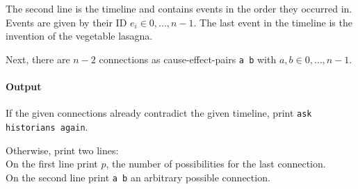 The second line is the timeline and contains events in the order they occurred in.
Events are given by their ID $e_i \in {0,...,n-1}$.
The last event in the timeline is the invention of the vegetable lasagna.

Next, there are $n-2$ connections as cause-effect-pairs \texttt{a b} with $a,b \in {0, \ldots ,n-1}$.

\paragraph*{Output}

If the given connections already contradict the given timeline, print \texttt{ask historians again}.

Otherwise, print two lines: \\
On the first line print $p$, the number of possibilities for the last connection. \\
On the second line print \texttt{a b} an arbitrary possible connection.

\begin{samples}
\end{samples}



